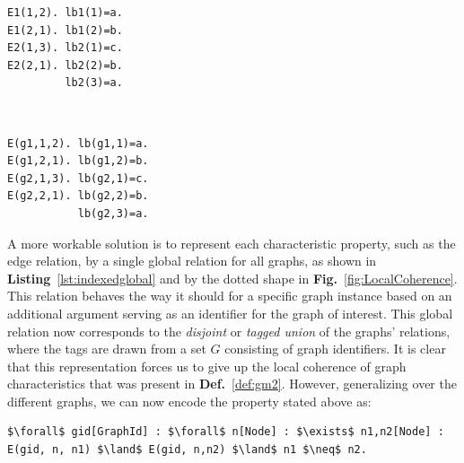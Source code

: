 \begin{minipage}[t]{0.45\linewidth}
\begin{lstlisting}[mathescape,caption=Multiple individual global relations,label=lst:multiglobal]
E1(1,2). lb1(1)=a.
E1(2,1). lb1(2)=b.
E2(1,3). lb2(1)=c.
E2(2,1). lb2(2)=b.
         lb2(3)=a.
\end{lstlisting}
\end{minipage}
\begin{minipage}[t]{0.1\linewidth}
 ~
\end{minipage}
\begin{minipage}[t]{0.45\linewidth}
\begin{lstlisting}[mathescape,caption=Disjoint union using indexed global relations,label=lst:indexedglobal]
E(g1,1,2). lb(g1,1)=a.
E(g1,2,1). lb(g1,2)=b.
E(g2,1,3). lb(g2,1)=c.
E(g2,2,1). lb(g2,2)=b.
           lb(g2,3)=a.
\end{lstlisting}
\end{minipage}




A more workable solution is to represent each characteristic property, such as the edge relation, by a single global relation for all graphs, as shown in \textbf{Listing}~\ref{lst:indexedglobal} and by the dotted shape in \textbf{Fig.}~\ref{fig:LocalCoherence}.
This relation behaves the way it should for a specific graph instance based on an additional argument serving as an identifier for the graph of interest.
This global relation now corresponds to the \emph{disjoint} or \emph{tagged union} of the graphs' relations, where the tags are drawn from a set $G$ consisting of graph identifiers.
It is clear that this representation forces us to give up the local coherence of graph characteristics that was present in \textbf{Def.}~\ref{def:gm2}.
%
However, generalizing over the different graphs, we can now encode the property stated above as:
\begin{center}
\begin{minipage}{0.95\linewidth}
\begin{lstlisting}[mathescape]
$\forall$ gid[GraphId] : $\forall$ n[Node] : $\exists$ n1,n2[Node] : E(gid, n, n1) $\land$ E(gid, n,n2) $\land$ n1 $\neq$ n2.
\end{lstlisting}
\end{minipage}
\end{center}

